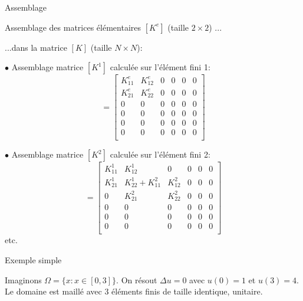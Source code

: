 \documentclass[
mode=present,    %
paper=a4paper,   %
orient=landscape,
display=slides,   %
size=10pt,     %
style=romain   %
]{powerdot}
\begin{document}
\begin{slide}{Assemblage}

Assemblage des matrices élémentaires $[K^e]$ (taille $2\times 2$) ...

...dans la matrice $[K]$ (taille $N\times N$):

$\bullet$ Assemblage matrice $[K^1]$ calculée sur l'élément fini 1:
\begin{equation*}
[K] =
     \begin{bmatrix}
        K^e_{11} & K^e_{12} &  0  & 0&  0  & 0    \\
        K^e_{21} & K^e_{22} &  0  & 0&  0  & 0    \\
               0 &        0 &  0  & 0&  0  & 0    \\
               0 &        0 &  0  & 0&  0  & 0    \\
               0 &        0 &  0  & 0&  0  & 0    \\
               0 &        0 &  0  & 0&  0  & 0    \\
    \end{bmatrix}
\end{equation*}

$\bullet$ Assemblage matrice $[K^2]$ calculée sur l'élément fini 2:
\begin{equation*}
[K] =
     \begin{bmatrix}
        K^1_{11} & K^1_{12} &  0  & 0&  0  & 0    \\
        K^1_{21} & K^1_{22}+K^2_{11} &  K^2_{12}  & 0&  0  & 0    \\
               0 & K^2_{21} & K^2_{22}  & 0 &  0  & 0    \\
               0 &        0 &  0  & 0&  0  & 0    \\
               0 &        0 &  0  & 0&  0  & 0    \\
               0 &        0 &  0  & 0&  0  & 0    \\
    \end{bmatrix}
\end{equation*}
etc.
\end{slide}



\begin{slide}{Exemple simple}

Imaginons $\Omega = \{ x : x \in[0, 3]\}$. On résout $\Delta u=0$ avec $u(0)=1$ et $u(3)=4$. Le domaine est maillé avec 3 éléments finis de taille identique, unitaire.

\begin{center}
    
\end{center}

\end{slide}
\end{document}
